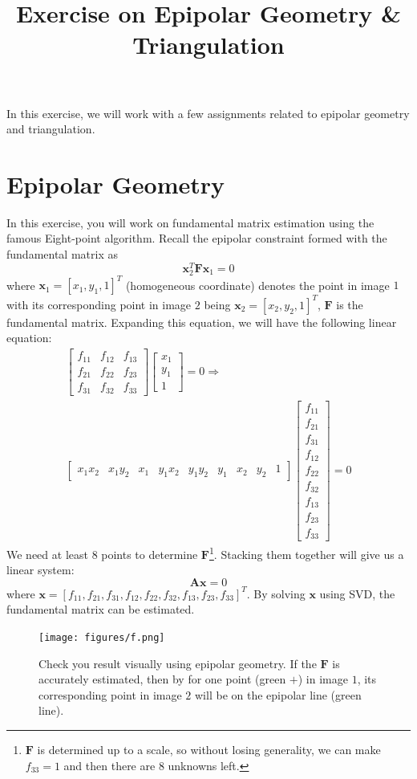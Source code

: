 \documentclass[a4paper]{article}
\begin{document}
\title{Exercise on Epipolar Geometry \& Triangulation}
\maketitle%

In this exercise, we will work with a few assignments related to epipolar geometry and triangulation.

\section{Epipolar Geometry}
In this exercise, you will work on fundamental matrix estimation using the famous Eight-point algorithm. Recall the epipolar constraint formed with the fundamental matrix as
$$
\mathbf{x}_2^T\mathbf{F}\mathbf{x}_1=0
$$
where $\mathbf{x}_1=[x_1,y_1,1]^T$ (homogeneous coordinate) denotes the point in image $1$ with its corresponding point in image $2$ being $\mathbf{x}_2=[x_2,y_2,1]^T$, $\mathbf{F}$ is the fundamental matrix. Expanding this equation, we will have the following linear equation:
\begin{align*}
[x_2,y_2,1]\left[\begin{matrix}
f_{11} & f_{12} & f_{13} \\
f_{21} & f_{22} & f_{23} \\
f_{31} & f_{32} & f_{33} 
\end{matrix}\right]\left[\begin{matrix}
x_1 \\
y_1 \\
1
\end{matrix}\right]=0 \Rightarrow \\
\left[\begin{matrix}
x_1x_2 & x_1y_2 & x_1 & y_1x_2 & y_1y_2 & y_1 & x_2 & y_2 & 1
\end{matrix}\right]\left[\begin{matrix}
f_{11} \\
f_{21} \\
f_{31} \\
f_{12} \\
f_{22} \\
f_{32} \\
f_{13} \\
f_{23} \\
f_{33} 
\end{matrix}\right]=0
\end{align*}
We need at least $8$ points to determine $\mathbf{F}$\footnote{$\mathbf{F}$ is determined up to a scale, so without losing generality, we can make $f_{33}=1$ and then there are $8$ unknowns left.}. Stacking them together will give us a linear system:
$$
\mathbf{Ax}=0
$$
where $\mathbf{x}=[f_{11}, f_{21}, f_{31}, f_{12}, f_{22},f_{32},f_{13},f_{23},f_{33}]^T$.
By solving $\mathbf{x}$ using SVD, the fundamental matrix can be estimated.
\begin{figure}[!b]
\centering
\texttt{[image: figures/f.png]}
\caption{Check you result visually using epipolar geometry. If the $\mathbf{F}$ is accurately estimated, then by for one point (green $+$) in image $1$, its corresponding point in image $2$ will be on the epipolar line (green line).}
\end{figure}
\end{document}
